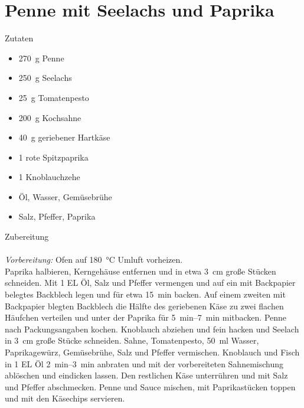 \section*{Penne mit Seelachs und Paprika}
\ihead{}\ohead{}
\cfoot{}
{\Large Zutaten}
\begin{multicols}{2}
\begin{itemize}
    \item \SI{270}{g} Penne
    \item \SI{250}{g} Seelachs
    \item \SI{25}{g} Tomatenpesto
    \item \SI{200}{g} Kochsahne
    \item \SI{40}{g} geriebener Hartkäse
    \item \num{1} rote Spitzpaprika
    \item \num{1} Knoblauchzehe
    \item Öl, Wasser, Gemüsebrühe
    \item Salz, Pfeffer, Paprika
\end{itemize}
\end{multicols}
\noindent
{\Large Zubereitung}\\
\\
\textit{Vorbereitung:} Ofen auf \SI{180}{\celsius} Umluft vorheizen.\\
Paprika halbieren, Kerngehäuse entfernen und in etwa \SI{3}{cm} große Stücken schneiden. 
Mit \num{1} EL Öl, Salz und Pfeffer vermengen und auf ein mit Backpapier belegtes Backblech legen und für etwa \SI{15}{min} backen.
Auf einem zweiten mit Backpapier blegten Backblech die Hälfte des geriebenen Käse zu zwei flachen Häufchen verteilen und unter der Paprika für \SIrange{5}{7}{min} mitbacken.
Penne nach Packungsangaben kochen. 
Knoblauch abziehen und fein hacken und Seelach in \SI{3}{cm} große Stücke schneiden.
Sahne, Tomatenpesto, \SI{50}{ml} Wasser, Paprikagewürz, Gemüsebrühe, Salz und Pfeffer vermischen. 
Knoblauch und Fisch in \num{1} EL Öl \SIrange{2}{3}{min} anbraten und mit der vorbereiteten Sahnemischung ablöschen und eindicken lassen.
Den restlichen Käse unterrühren und mit Salz und Pfeffer abschmecken. 
Penne und Sauce mischen, mit Paprikastücken toppen und mit den Käsechips servieren. 
